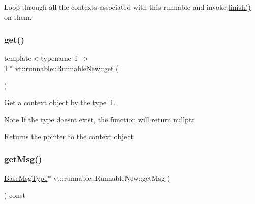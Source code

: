 Loop through all the contexts associated with this runnable and invoke {\ttfamily \hyperlink{structvt_1_1runnable_1_1_runnable_new_a089297ae1be6e7bf33ae28611b12db17}{finish()}} on them. 

\mbox{\label{structvt_1_1runnable_1_1_runnable_new_a140176f3b035d504ad1e726e3c7b09fa}} 
\subsubsection{\texorpdfstring{get()}{get()}}
{\footnotesize\ttfamily template$<$typename T $>$ \\
T$\ast$ vt\+::runnable\+::\+Runnable\+New\+::get (\begin{DoxyParamCaption}{ }\end{DoxyParamCaption})}



Get a context object by the type {\ttfamily T}. 

\begin{DoxyNote}{Note}
If the type doesn\textquotesingle{}t exist, the function will return {\ttfamily nullptr} 
\end{DoxyNote}
\begin{DoxyReturn}{Returns}
the pointer to the context object 
\end{DoxyReturn}
\mbox{\label{structvt_1_1runnable_1_1_runnable_new_aed655dff826a821a3db9162259f33288}} 
\subsubsection{\texorpdfstring{get\+Msg()}{getMsg()}}
{\footnotesize\ttfamily \hyperlink{namespacevt_a44d0d4e144748f2b19a1cfd962f50338}{Base\+Msg\+Type}$\ast$ vt\+::runnable\+::\+Runnable\+New\+::get\+Msg (\begin{DoxyParamCaption}{ }\end{DoxyParamCaption}) const\hspace{0.3cm}{\ttfamily [inline]}}



